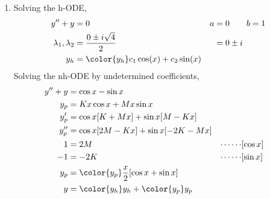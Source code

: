 \begin{enumerate}
    \item Solving the h-ODE,
          \begin{align}
              y'' + y                  & = 0                                         & a & = 0 \qquad b = 1 \\
              \lambda_{1}, \lambda_{2} & = \frac{0 \pm i\sqrt{4}}{2}                 &   & = 0 \pm i        \\
              y_{h}                    & = {\color{y_h} c_{1}\cos(x) + c_{2}\sin(x)}
          \end{align}
          Solving the nh-ODE by undetermined coefficients,
          \begin{align}
              y'' + y & = \cos x - \sin x                                                      \\
              y_{p}   & = Kx\cos x + Mx\sin x                                                  \\
              y_{p}'  & = \cos x [K + Mx] + \sin x [M - Kx]                                    \\
              y_{p}'' & = \cos x [2M - Kx] + \sin x [-2K - Mx]                                 \\
              1       & = 2M                                         & \cdots\cdots & [\cos x] \\
              -1      & =  -2K                                       & \cdots\cdots & [\sin x] \\
              y_{p}   & = {\color{y_p} \frac{x}{2}[\cos x + \sin x]}                           \\
              y       & = {\color{y_h} y_{h}} + {\color{y_p} y_{p}}
          \end{align}


\end{enumerate}
